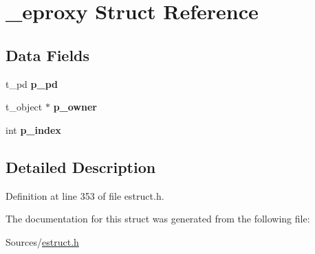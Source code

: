 \hypertarget{struct__eproxy}{\section{\-\_\-eproxy Struct Reference}
\label{struct__eproxy}
}
\subsection*{Data Fields}
\begin{DoxyCompactItemize}
\item 
\hypertarget{struct__eproxy_a818a512bafab5b368d1fa0bca9872451}{t\-\_\-pd {\bfseries p\-\_\-pd}}\label{struct__eproxy_a818a512bafab5b368d1fa0bca9872451}

\item 
\hypertarget{struct__eproxy_aafbddf848d70a14ab336be2b19cc535f}{t\-\_\-object $\ast$ {\bfseries p\-\_\-owner}}\label{struct__eproxy_aafbddf848d70a14ab336be2b19cc535f}

\item 
\hypertarget{struct__eproxy_adf4f65c8db21f49ab60d62fedcfa9192}{int {\bfseries p\-\_\-index}}\label{struct__eproxy_adf4f65c8db21f49ab60d62fedcfa9192}

\end{DoxyCompactItemize}


\subsection{Detailed Description}


Definition at line 353 of file estruct.\-h.



The documentation for this struct was generated from the following file\-:\begin{DoxyCompactItemize}
\item 
Sources/\hyperlink{estruct_8h}{estruct.\-h}\end{DoxyCompactItemize}
